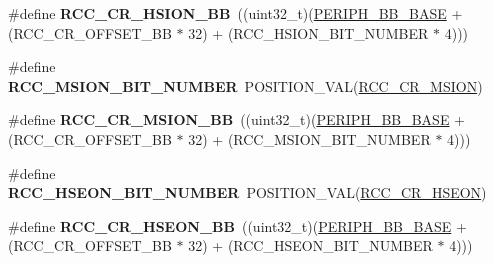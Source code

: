 \begin{DoxyCompactItemize}
\item 
\hypertarget{group___r_c_c___bit_address___alias_region_gabd3eca3cc8b1501f9d8a62c4a0ebcfe7}{\#define {\bfseries R\-C\-C\-\_\-\-C\-R\-\_\-\-H\-S\-I\-O\-N\-\_\-\-B\-B}~((uint32\-\_\-t)(\hyperlink{group___peripheral__memory__map_gaed7efc100877000845c236ccdc9e144a}{P\-E\-R\-I\-P\-H\-\_\-\-B\-B\-\_\-\-B\-A\-S\-E} + (R\-C\-C\-\_\-\-C\-R\-\_\-\-O\-F\-F\-S\-E\-T\-\_\-\-B\-B $\ast$ 32) + (R\-C\-C\-\_\-\-H\-S\-I\-O\-N\-\_\-\-B\-I\-T\-\_\-\-N\-U\-M\-B\-E\-R $\ast$ 4)))}\label{group___r_c_c___bit_address___alias_region_gabd3eca3cc8b1501f9d8a62c4a0ebcfe7}

\item 
\hypertarget{group___r_c_c___bit_address___alias_region_gad64ec34200ec2d3f3d1717cbc8ba1244}{\#define {\bfseries R\-C\-C\-\_\-\-M\-S\-I\-O\-N\-\_\-\-B\-I\-T\-\_\-\-N\-U\-M\-B\-E\-R}~P\-O\-S\-I\-T\-I\-O\-N\-\_\-\-V\-A\-L(\hyperlink{group___peripheral___registers___bits___definition_gaee09fff7bffaaabc64d99627f2249795}{R\-C\-C\-\_\-\-C\-R\-\_\-\-M\-S\-I\-O\-N})}\label{group___r_c_c___bit_address___alias_region_gad64ec34200ec2d3f3d1717cbc8ba1244}

\item 
\hypertarget{group___r_c_c___bit_address___alias_region_ga58be354019d67406b5b1788377caa74e}{\#define {\bfseries R\-C\-C\-\_\-\-C\-R\-\_\-\-M\-S\-I\-O\-N\-\_\-\-B\-B}~((uint32\-\_\-t)(\hyperlink{group___peripheral__memory__map_gaed7efc100877000845c236ccdc9e144a}{P\-E\-R\-I\-P\-H\-\_\-\-B\-B\-\_\-\-B\-A\-S\-E} + (R\-C\-C\-\_\-\-C\-R\-\_\-\-O\-F\-F\-S\-E\-T\-\_\-\-B\-B $\ast$ 32) + (R\-C\-C\-\_\-\-M\-S\-I\-O\-N\-\_\-\-B\-I\-T\-\_\-\-N\-U\-M\-B\-E\-R $\ast$ 4)))}\label{group___r_c_c___bit_address___alias_region_ga58be354019d67406b5b1788377caa74e}

\item 
\hypertarget{group___r_c_c___bit_address___alias_region_gaa9092b285e421195958ef49d9396b321}{\#define {\bfseries R\-C\-C\-\_\-\-H\-S\-E\-O\-N\-\_\-\-B\-I\-T\-\_\-\-N\-U\-M\-B\-E\-R}~P\-O\-S\-I\-T\-I\-O\-N\-\_\-\-V\-A\-L(\hyperlink{group___peripheral___registers___bits___definition_gadb8228c9020595b4cf9995137b8c9a7d}{R\-C\-C\-\_\-\-C\-R\-\_\-\-H\-S\-E\-O\-N})}\label{group___r_c_c___bit_address___alias_region_gaa9092b285e421195958ef49d9396b321}

\item 
\hypertarget{group___r_c_c___bit_address___alias_region_gabefdd36d54615fa5771dccb9985ec3b6}{\#define {\bfseries R\-C\-C\-\_\-\-C\-R\-\_\-\-H\-S\-E\-O\-N\-\_\-\-B\-B}~((uint32\-\_\-t)(\hyperlink{group___peripheral__memory__map_gaed7efc100877000845c236ccdc9e144a}{P\-E\-R\-I\-P\-H\-\_\-\-B\-B\-\_\-\-B\-A\-S\-E} + (R\-C\-C\-\_\-\-C\-R\-\_\-\-O\-F\-F\-S\-E\-T\-\_\-\-B\-B $\ast$ 32) + (R\-C\-C\-\_\-\-H\-S\-E\-O\-N\-\_\-\-B\-I\-T\-\_\-\-N\-U\-M\-B\-E\-R $\ast$ 4)))}\label{group___r_c_c___bit_address___alias_region_gabefdd36d54615fa5771dccb9985ec3b6}


\end{DoxyCompactItemize}
